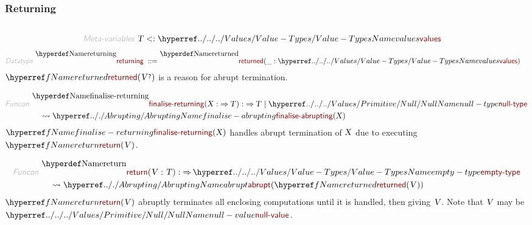 \subsubsection*{Returning}\hypertarget{returning}{}\label{returning}

\begin{align*}
  [ ~ 
  \KEY{Datatype} ~ & \NAMEREF{returning} \\
  \KEY{Funcon} ~ & \NAMEREF{returned} \\
  \KEY{Funcon} ~ & \NAMEREF{finalise-returning} \\
  \KEY{Funcon} ~ & \NAMEREF{return} \\
  \KEY{Funcon} ~ & \NAMEREF{handle-return}
  ~ ]
\end{align*}
\begin{align*}
  \KEY{Meta-variables} ~ 
  & \VAR{T} <: \NAMEHYPER{../../../Values}{Value-Types}{values}
\end{align*}
\begin{align*}
  \KEY{Datatype} ~ 
  \NAMEDECL{returning}  
  ~ ::= ~ & \NAMEDECL{returned} (\_ : \NAMEHYPER{../../../Values}{Value-Types}{values})
\end{align*}
$\SHADE{\NAMEREF{returned}
           ( \VAR{V}\QUERY )}$ is a reason for abrupt termination.

\begin{align*}
  \KEY{Funcon} ~ 
  & \NAMEDECL{finalise-returning}(\VAR{X} :  \TO \VAR{T}) :  \TO \VAR{T} \mid \NAMEHYPER{../../../Values/Primitive}{Null}{null-type} \\
  & \quad \leadsto \NAMEHYPER{../.}{Abrupting}{finalise-abrupting}
                     ( \VAR{X} )
\end{align*}
$\SHADE{\NAMEREF{finalise-returning}
           ( \VAR{X} )}$ handles abrupt termination of $\SHADE{\VAR{X}}$ due to
  executing $\SHADE{\NAMEREF{return}
           ( \VAR{V} )}$.

\begin{align*}
  \KEY{Funcon} ~ 
  & \NAMEDECL{return}(\VAR{V} : \VAR{T}) :  \TO \NAMEHYPER{../../../Values}{Value-Types}{empty-type} \\
  & \quad \leadsto \NAMEHYPER{../.}{Abrupting}{abrupt}
                     ( \NAMEREF{returned}
                         ( \VAR{V} ) )
\end{align*}
$\SHADE{\NAMEREF{return}
           ( \VAR{V} )}$ abruptly terminates all enclosing computations until it is
  handled, then giving $\SHADE{\VAR{V}}$. Note that $\SHADE{\VAR{V}}$ may be $\SHADE{\NAMEHYPER{../../../Values/Primitive}{Null}{null-value}}$.

